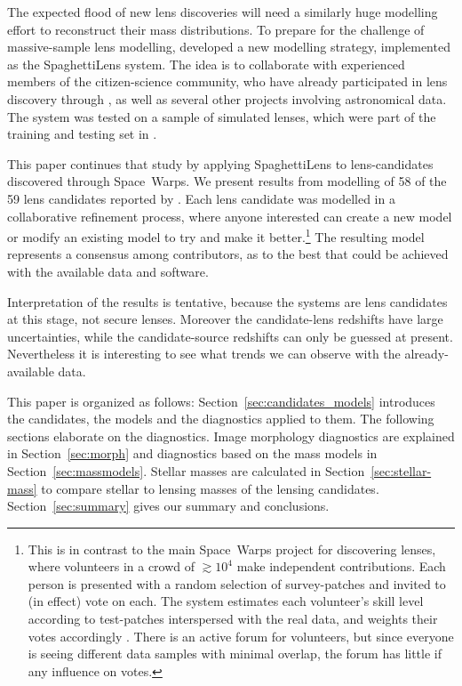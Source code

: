 The expected flood of new lens discoveries will need a similarly huge
modelling effort to reconstruct their mass distributions.  To prepare
for the challenge of massive-sample lens modelling,
\cite{2015MNRAS.447.2170K} developed a new modelling strategy,
implemented as the SpaghettiLens system.  The idea is to collaborate
with experienced members of the citizen-science community, who have
already participated in lens discovery through \SW, as well as several
other projects involving astronomical data.  The system was tested on
a sample of simulated lenses, which were part of the training and
testing set in \SW.

This paper continues that study by applying SpaghettiLens to
lens-candidates discovered through Space~Warps.  We present results
from modelling of 58 of the 59 lens candidates reported by
\cite{2016MNRAS.455.1191M}.  Each lens candidate was modelled in a
collaborative refinement process, where anyone interested can create a
new model or modify an existing model to try and make it
better.\footnote{This is in contrast to the main Space~Warps project
  for discovering lenses, where volunteers in a crowd of $\gtrsim10^4$
  make independent contributions.  Each person is presented with a
  random selection of survey-patches and invited to (in effect) vote
  on each.  The system estimates each volunteer's skill level
  according to test-patches interspersed with the real data, and
  weights their votes accordingly \citep{2016MNRAS.455.1171M}.  There
  is an active forum for volunteers, but since everyone is seeing
  different data samples with minimal overlap, the forum has little if
  any influence on votes.}  The resulting model represents a consensus
among contributors, as to the best that could be achieved with the
available data and software.

Interpretation of the results is tentative,
because the systems are lens candidates at this stage, not secure lenses.
Moreover the candidate-lens redshifts have large uncertainties, while
the candidate-source redshifts can only be guessed at present.
Nevertheless it is interesting to see what trends we can observe with
the already-available data.

This paper is organized as follows:
Section~\ref{sec:candidates_models} introduces the candidates, the models and the diagnostics applied to them.
The following sections elaborate on the diagnostics.
Image morphology diagnostics are explained in Section~\ref{sec:morph} and
diagnostics based on the mass models in Section~\ref{sec:massmodels}.
Stellar masses are calculated in Section~\ref{sec:stellar-mass} to compare stellar to lensing masses of the lensing candidates.
Section~\ref{sec:summary} gives our summary and conclusions.


